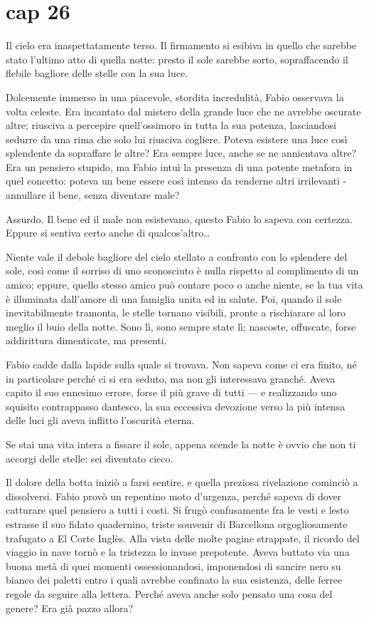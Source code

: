 \chapter{cap 26}

Il cielo era inaspettatamente terso. Il firmamento si esibiva in quello che sarebbe stato l'ultimo atto di quella notte: presto il sole sarebbe sorto, sopraffacendo il flebile bagliore delle stelle con la sua luce.

Dolcemente immerso in una piacevole, stordita incredulità, Fabio osservava la volta celeste. Era incantato dal mistero della grande luce che ne avrebbe oscurate altre; riusciva a percepire quell'ossimoro in tutta la sua potenza, lasciandosi sedurre da una rima che solo lui riusciva cogliere. Poteva esistere una luce così splendente da sopraffare le altre? Era sempre luce, anche se ne annientava altre? Era un pensiero stupido, ma Fabio intuì la presenza di una potente metafora in quel concetto: poteva un bene essere così intenso da renderne altri irrilevanti - annullare il bene, senza diventare male?

Assurdo. Il bene ed il male non esistevano, questo Fabio lo sapeva con certezza. Eppure si sentiva certo anche di qualcos'altro\ldots{}

Niente vale il debole bagliore del cielo stellato a confronto con lo splendere del sole, così come il sorriso di uno sconosciuto è nulla rispetto al complimento di un amico; eppure, quello stesso amico può contare poco o anche niente, se la tua vita è illuminata dall'amore di una famiglia unita ed in salute. Poi, quando il sole inevitabilmente tramonta, le stelle tornano visibili, pronte a rischiarare al loro meglio il buio della notte. Sono lì, sono sempre state lì; nascoste, offuscate, forse addirittura dimenticate, ma presenti.

Fabio cadde dalla lapide sulla quale si trovava. Non sapeva come ci era finito, né in particolare perché ci si era seduto, ma non gli interessava granché. Aveva capito il suo ennesimo errore, forse il più grave di tutti --- e realizzando uno squisito contrappasso dantesco, la sua eccessiva devozione verso la più intensa delle luci gli aveva inflitto l'oscurità eterna.

Se stai una vita intera a fissare il sole, appena scende la notte è ovvio che non ti accorgi delle stelle: sei diventato cieco.

Il dolore della botta iniziò a farsi sentire, e quella preziosa rivelazione cominciò a dissolversi. Fabio provò un repentino moto d'urgenza, perché sapeva di dover catturare quel pensiero a tutti i costi. Si frugò confusamente fra le vesti e lesto estrasse il suo fidato quadernino, triste souvenir di Barcellona orgogliosamente trafugato a El Corte Inglès. Alla vista delle molte pagine strappate, il ricordo del viaggio in nave tornò e la tristezza lo invase prepotente. Aveva buttato via una buona metà di quei momenti ossessionandosi, imponendosi di sancire nero su bianco dei paletti entro i quali avrebbe confinato la sua esistenza, delle ferree regole da seguire alla lettera. Perché aveva anche solo pensato una cosa del genere? Era già pazzo allora?

